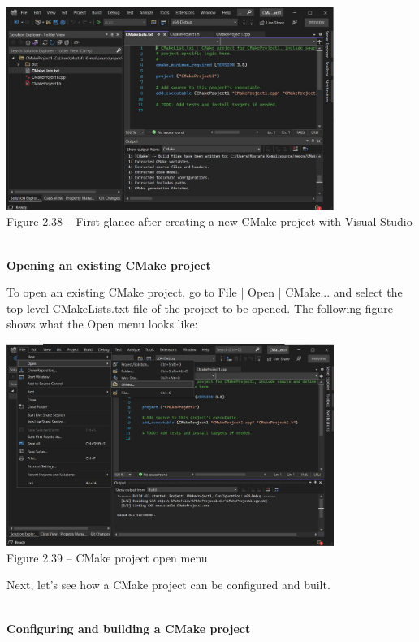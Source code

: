 \begin{center}
\includegraphics[width=0.8\textwidth]{content/1/chapter2/images/38.jpg}\\
Figure 2.38 – First glance after creating a new CMake project with Visual Studio
\end{center}

\hspace*{\fill} \\ %
\noindent
\textbf{Opening an existing CMake project}

To open an existing CMake project, go to File | Open | CMake... and select the top-level CMakeLists.txt file of the project to be opened. The following figure shows what the Open menu looks like:

\begin{center}
\includegraphics[width=0.8\textwidth]{content/1/chapter2/images/39.jpg}\\
Figure 2.39 – CMake project open menu
\end{center}

Next, let's see how a CMake project can be configured and built.

\hspace*{\fill} \\ %
\noindent
\textbf{Configuring and building a CMake project}

